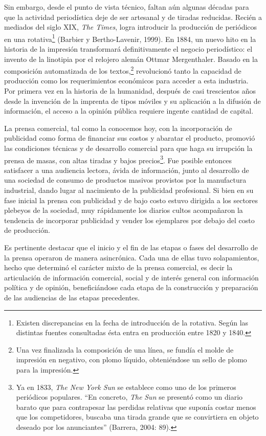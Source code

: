 Sin embargo, desde el punto de vista técnico, faltan aún algunas décadas para que la actividad periodística deje de ser artesanal y de tiradas reducidas. Recién a mediados del siglo XIX, \emph{The Times}, logra introducir la producción de periódicos en una rotativa\footnote{Existen discrepancias en la fecha de introducción de la rotativa. Según las distintas fuentes consultadas ésta entra en producción entre 1820 y 1840.} (Barbier y Bertho-Lavenir, 1999). En 1884, un nuevo hito en la historia de la impresión transformará definitivamente el negocio periodístico: el invento de la linotipia por el relojero alemán Ottmar Mergenthaler. Basado en la composición automatizada de los textos,\footnote{Una vez finalizada la composición de una línea, se fundía el molde de impresión en negativo, con plomo líquido, obteniéndose un sello de plomo para la impresión.} revolucionó tanto la capacidad de producción como los requerimientos económicos para acceder a esta industria. Por primera vez en la historia de la humanidad, después de casi trescientos años desde la invención de la imprenta de tipos móviles y su aplicación a la difusión de información, el acceso a la opinión pública requiere ingente cantidad de capital.

La prensa comercial, tal como la conocemos hoy, con la incorporación de publicidad como forma de financiar sus costos y abaratar el producto, promovió las condiciones técnicas y de desarrollo comercial para que haga su irrupción la prensa de masas, con altas tiradas y bajos precios\footnote{Ya en 1833, \emph{The New York Sun} se establece como uno de los primeros periódicos populares. ``En concreto, \emph{The} \emph{Sun} se presentó como un diario barato  que para contrapesar las perdidas relativas que suponía costar menos que los competidores, buscaba una tirada grande que se convirtiera en objeto deseado por los anunciantes'' (Barrera, 2004: 89).}. Fue posible entonces satisfacer a una audiencia lectora, ávida de información, junto al desarrollo de una sociedad de consumo de productos masivos provistos por la manufactura industrial, dando lugar al nacimiento de la publicidad profesional. Si bien en su fase inicial la prensa con publicidad y de bajo costo estuvo dirigida a los sectores plebeyos de la sociedad, muy rápidamente los diarios cultos acompañaron la tendencia de incorporar publicidad y vender los ejemplares por debajo del costo de producción.

Es pertinente destacar que el inicio y el fin de las etapas o fases del desarrollo de la prensa operaron de manera asincrónica. Cada una de ellas tuvo solapamientos, hecho que determinó el carácter mixto de la prensa comercial, es decir la articulación de información comercial, social y de interés general con información política y de opinión, beneficiándose cada etapa de la construcción y preparación de las audiencias de las etapas precedentes.

